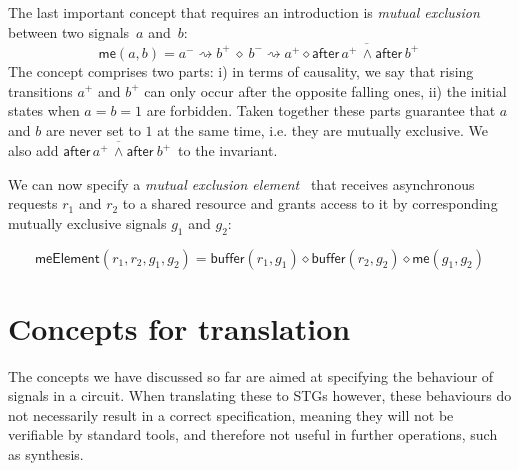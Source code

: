 \documentclass[british, journal]{IEEEtran}
\begin{document}
%

The last important concept that requires an introduction is \emph{mutual
exclusion} between two signals~$a$ and~$b$:
\[
\mathsf{me}(a, b) = a^{-}\rightsquigarrow b^{+}\ \diamond\ b^{-}\rightsquigarrow
a^{+}\diamond\overline{\mathsf{after}\,a^{+} \, \wedge\mathsf{after}\,b^{+}\, }
\]
The concept comprises two parts: i) in terms of causality, we say
that rising transitions $a^{+}$ and $b^{+}$ can only occur after
the opposite falling ones, ii) the initial states when $a=b=1$ are
forbidden. Taken together these parts guarantee that $a$ and
$b$ are never set to $1$ at the same time, i.e. they are mutually
exclusive. We also add $\overline{\mathsf{after}\, a^{+} \,
\wedge\mathsf{after}\ b^{+}\,}$
to the invariant.

We can now specify a \emph{mutual exclusion
element}~\cite{2008_kinniment_synchronisation}
that receives asynchronous requests $r_{1}$ and $r_{2}$ to a shared
resource and grants access to it by corresponding mutually exclusive
signals $g_{1}$ and $g_{2}$:

\vspace{-3mm}
{\small
\[
\mathsf{meElement}(r_{1}, r_{2}, g_{1}, g_{2})\!=\!\mathsf{buffer}(r_{1}, g_{1})
\diamond \mathsf{buffer}(r_{2}, g_{2}) \diamond \mathsf{me}(g_{1}, g_{2})
\]}

\vspace{-7mm}

\section{Concepts for translation\label{sec:trans-concepts}}

The concepts we have discussed so far are aimed at specifying the behaviour of signals in a circuit.
When translating these to STGs however, these behaviours do not necessarily result in a correct
specification, meaning they will not be verifiable by standard tools, and therefore not useful in 
further operations, such as synthesis.
\end{document}
